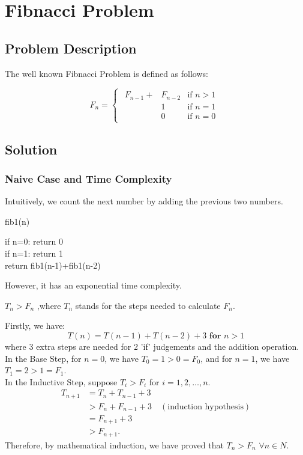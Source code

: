 \section{Fibnacci Problem}
\subsection{Problem Description}
The well known Fibnacci Problem is defined as follows:
\begin{defi}
\begin{equation}
F_n = 
\begin{cases}
\begin{aligned}
    F_{n-1}+& F_{n-2} & \text{if } n > 1 \\
    &1  & \text{if } n = 1 \\
    &0  & \text{if } n = 0
\end{aligned}
\end{cases}
\label{eq:Fn}
\end{equation}
\end{defi}
\subsection{Solution}
\subsubsection{Naive Case and Time Complexity}
Intuitively, we count the next number by adding the previous two numbers.
\begin{algorithm}
    \caption{fib1(n)}
    if n=0: return 0\\
    if n=1: return 1\\
    return fib1(n-1)+fib1(n-2)
    \end{algorithm}

However, it has an exponential time complexity.

\begin{lemma}
    $T_{n} > F_{n}$ ,where $T_{n}$ stands for the steps needed to calculate $F_{n}$.
\end{lemma}

\begin{prf}
    Firstly, we have:
    \[
        T(n) = T(n-1) + T(n-2) + 3 \textbf{ for }n > 1
        \]
        where 3 extra steps are needed for 2 'if' judgements and the addition operation.\\
    In the Base Step, for $n=0$, we have $T_0 = 1 > 0 = F_0$, and for $n=1$, we have $T_1 = 2 > 1 = F_1$.\\
In the Inductive Step, suppose $T_i > F_i$ for $i = 1, 2, \ldots, n$.
\begin{align*}
    T_{n+1} &= T_n + T_{n-1} + 3 \\
    &> F_n + F_{n-1} + 3 \quad (\text{induction hypothesis}) \\
    &= F_{n+1} + 3 \\
    &> F_{n+1}.
    \end{align*}
    Therefore, by mathematical induction, we have proved that $T_n > F_n$  $ \forall n \in N$.
\end{prf}

